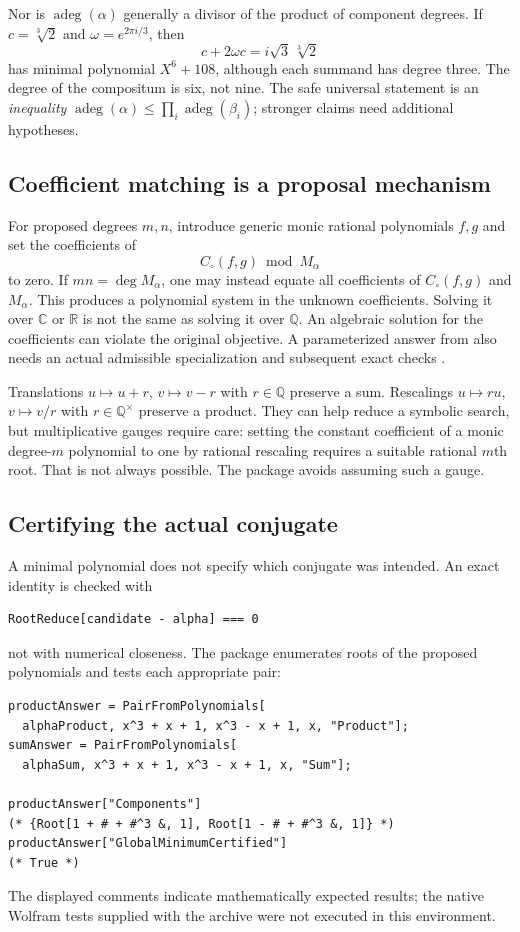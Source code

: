 \documentclass[11pt]{article}
\newcommand{\Q}{\mathbb Q}
\newcommand{\C}{\mathbb C}
\newcommand{\adeg}{\operatorname{adeg}}
\newcommand{\code}[1]{\texttt{\detokenize{#1}}}
\theoremstyle{definition}\newtheorem{definition}[theorem]{Definition}
\theoremstyle{remark}\newtheorem{remark}[theorem]{Remark}
\begin{document}
Nor is $\adeg(\alpha)$ generally a divisor of the product of component degrees.
If $c=\sqrt[3]{2}$ and $\omega=e^{2\pi i/3}$, then
\[
 c+2\omega c=i\sqrt3\,\sqrt[3]{2}
\]
has minimal polynomial $X^6+108$, although each summand has degree three.
The degree of the compositum is six, not nine. The safe universal statement
is an \emph{inequality} $\adeg(\alpha)\le\prod_i\adeg(\beta_i)$; stronger
claims need additional hypotheses.

\subsection{Coefficient matching is a proposal mechanism}
For proposed degrees $m,n$, introduce generic monic rational polynomials
$f,g$ and set the coefficients of
\[
 C_\circ(f,g)\bmod M_\alpha
\]
to zero. If $mn=\deg M_\alpha$, one may instead equate all coefficients of
$C_\circ(f,g)$ and $M_\alpha$.
This produces a polynomial system in the unknown coefficients. Solving it
over $\C$ or $\mathbb R$ is not the same as solving it over $\Q$.
An algebraic solution for the coefficients can violate the original objective.
A parameterized answer from \code{Solve} also needs an actual admissible
specialization and subsequent exact checks \cite{solve}.

Translations $u\mapsto u+r$, $v\mapsto v-r$ with $r\in\Q$ preserve a sum.
Rescalings $u\mapsto ru$, $v\mapsto v/r$ with $r\in\Q^\times$ preserve a
product. They can help reduce a symbolic search, but multiplicative gauges
require care: setting the constant coefficient of a monic degree-$m$
polynomial to one by rational rescaling requires a suitable rational $m$th
root. That is not always possible. The package avoids assuming such a gauge.

\subsection{Certifying the actual conjugate}
A minimal polynomial does not specify which conjugate was intended. An exact
identity is checked with
\begin{lstlisting}
RootReduce[candidate - alpha] === 0
\end{lstlisting}
not with numerical closeness. The package enumerates roots of the proposed
polynomials and tests each appropriate pair:
\begin{lstlisting}
productAnswer = PairFromPolynomials[
  alphaProduct, x^3 + x + 1, x^3 - x + 1, x, "Product"];
sumAnswer = PairFromPolynomials[
  alphaSum, x^3 + x + 1, x^3 - x + 1, x, "Sum"];

productAnswer["Components"]
(* {Root[1 + # + #^3 &, 1], Root[1 - # + #^3 &, 1]} *)
productAnswer["GlobalMinimumCertified"]
(* True *)
\end{lstlisting}
The displayed comments indicate mathematically expected results; the native
Wolfram tests supplied with the archive were not executed in this environment.
\end{document}
